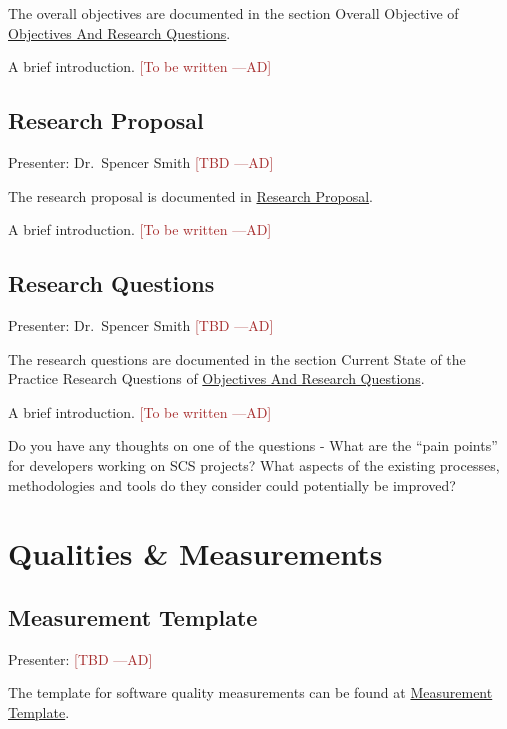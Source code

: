 \documentclass[12pt]{article}
\newcommand{\authornote}[3]{\textcolor{#1}{[#3 ---#2]}}
\newcommand{\authornote}[3]{}
\newcommand{\ad}[1]{\authornote{brown}{AD}{#1}} %
\begin{document}
The overall objectives are documented in the section Overall Objective of
\href{https://github.com/smiths/AIMSS/blob/master/OverallResearchProposal/ObjectivesAndResearchQuestions.pdf}{Objectives
And Research Questions}.

A brief introduction. \ad{To be written}

\subsection{Research Proposal}
\label{research_proposal}
Presenter: Dr.\ Spencer Smith \ad{TBD}

The research proposal is documented in
\href{https://github.com/smiths/AIMSS/blob/master/OverallResearchProposal/ResearchProposal.pdf}{Research
	Proposal}.

A brief introduction. \ad{To be written}

\subsection{Research Questions}
\label{research_questions}
Presenter: Dr.\ Spencer Smith \ad{TBD}

The research questions are documented in the section Current State of the
Practice Research Questions of
\href{https://github.com/smiths/AIMSS/blob/master/OverallResearchProposal/ObjectivesAndResearchQuestions.pdf}{Objectives
And Research Questions}.

A brief introduction. \ad{To be written}

Do you have any thoughts on one of the questions - What are the ``pain points''
for developers working on SCS projects? What aspects of the existing processes,
methodologies and tools do they consider could potentially be improved?

\section{Qualities \& Measurements}
\label{qualities_Measurements}

\subsection{Measurement Template}
\label{measurement_template}
Presenter: \ad{TBD}

The template for software quality measurements can be found at
\href{https://github.com/smiths/AIMSS/blob/master/StateOfPractice/Combined_MeasurementTemplate_EmpiricalMeasures.xlsx}{Measurement
	Template}.
\end{document}
